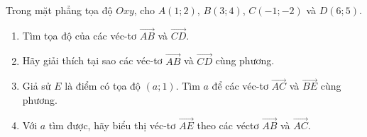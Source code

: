 \begin{bt}%
	Trong mặt phẳng tọa độ $Oxy$, cho $A(1;2)$, $B(3;4)$, $C(-1;-2)$ và $D(6;5)$.

		\begin{enumerate}
			\item Tìm tọa độ của các véc-tơ $\overrightarrow{AB}$ và $\overrightarrow{CD}$.
			\item Hãy giải thích tại sao các véc-tơ $\overrightarrow{AB}$ và $\overrightarrow{CD}$ cùng phương.
			\item Giả sử $E$ là điểm có tọa độ $(a;1)$. Tìm $a$ để các véc-tơ $\overrightarrow{AC}$ và $\overrightarrow{BE}$ cùng phương.
			\item  Với $a$ tìm được, hãy biểu thị véc-tơ $\overrightarrow{AE}$ theo các véctơ $\overrightarrow{AB}$ và $\overrightarrow{AC}$.
		\end{enumerate}

\end{bt}

